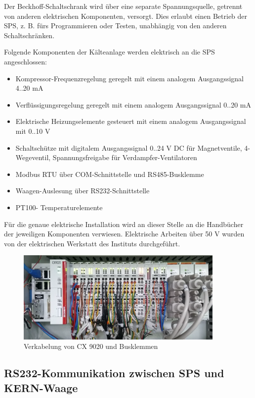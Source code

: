 Der Beckhoff-Schaltschrank wird über eine separate Spannungsquelle, getrennt von anderen elektrischen Komponenten,  versorgt. Dies erlaubt einen Betrieb der SPS, z. B. fürs Programmieren oder Testen, unabhängig von den anderen Schaltschränken. 

Folgende Komponenten der Kälteanlage werden elektrisch an die SPS angeschlossen: 
\begin{itemize}
\item	Kompressor-Frequenzregelung geregelt mit einem analogem Ausgangssignal 4..20 mA
\item	Verflüssigungsregelung geregelt mit einem analogem Ausgangssignal  0..20 mA
\item	Elektrische Heizungselemente gesteuert mit einem analogem Ausgangssignal mit 0..10 V
\item	Schaltschütze mit digitalem Ausgangssignal 0..24 V DC für Magnetventile, 4-Wegeventil, Spannungsfreigabe für Verdampfer-Ventilatoren
\item 	Modbus RTU über COM-Schnittstelle und RS485-Busklemme
\item 	Waagen-Auslesung über RS232-Schnittstelle
\item 	PT100- Temperaturelemente 
\end{itemize}

Für die genaue elektrische Installation wird an dieser Stelle an die Handbücher der jeweiligen Komponenten verwiesen. Elektrische Arbeiten über 50 V wurden von der elektrischen Werkstatt des Instituts durchgeführt. \citep{MicroNovaAG2011}

\begin{figure}[htb]
\centering		\includegraphics[width=0.90\textwidth]{Pictures/Versuchsaufbau/SPS_BILD.png}
\caption{Verkabelung von CX 9020 und Busklemmen}
\label{fig:}
\end{figure}

\newpage
\subsection{RS232-Kommunikation zwischen SPS und KERN-Waage}
\label{subsec:RS232-Verbindung}


